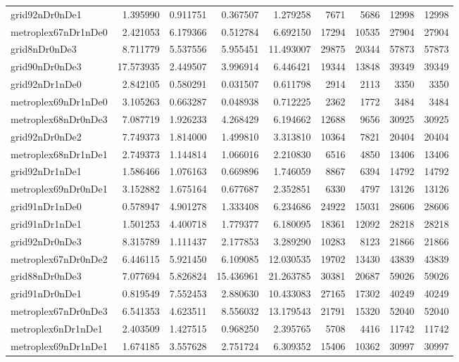 \begin{longtable}{|l|r|r|r|r|r|r|r|r|}
grid92nDr0nDe1 & 1.395990 & 0.911751 & 0.367507 & 1.279258 & 7671 & 5686 & 12998 & 12998 \\
metroplex67nDr1nDe0 & 2.421053 & 6.179366 & 0.512784 & 6.692150 & 17294 & 10535 & 27904 & 27904 \\
grid8nDr0nDe3 & 8.711779 & 5.537556 & 5.955451 & 11.493007 & 29875 & 20344 & 57873 & 57873 \\
grid90nDr0nDe3 & 17.573935 & 2.449507 & 3.996914 & 6.446421 & 19344 & 13848 & 39349 & 39349 \\
grid92nDr1nDe0 & 2.842105 & 0.580291 & 0.031507 & 0.611798 & 2914 & 2113 & 3350 & 3350 \\
metroplex69nDr1nDe0 & 3.105263 & 0.663287 & 0.048938 & 0.712225 & 2362 & 1772 & 3484 & 3484 \\
metroplex68nDr0nDe3 & 7.087719 & 1.926233 & 4.268429 & 6.194662 & 12688 & 9656 & 30925 & 30925 \\
grid92nDr0nDe2 & 7.749373 & 1.814000 & 1.499810 & 3.313810 & 10364 & 7821 & 20404 & 20404 \\
metroplex68nDr1nDe1 & 2.749373 & 1.144814 & 1.066016 & 2.210830 & 6516 & 4850 & 13406 & 13406 \\
grid92nDr1nDe1 & 1.586466 & 1.076163 & 0.669896 & 1.746059 & 8867 & 6394 & 14792 & 14792 \\
metroplex69nDr0nDe1 & 3.152882 & 1.675164 & 0.677687 & 2.352851 & 6330 & 4797 & 13126 & 13126 \\
grid91nDr1nDe0 & 0.578947 & 4.901278 & 1.333408 & 6.234686 & 24922 & 15031 & 28606 & 28606 \\
grid91nDr1nDe1 & 1.501253 & 4.400718 & 1.779377 & 6.180095 & 18361 & 12092 & 28218 & 28218 \\
grid92nDr0nDe3 & 8.315789 & 1.111437 & 2.177853 & 3.289290 & 10283 & 8123 & 21866 & 21866 \\
metroplex67nDr0nDe2 & 6.446115 & 5.921450 & 6.109085 & 12.030535 & 19702 & 13430 & 43839 & 43839 \\
grid88nDr0nDe3 & 7.077694 & 5.826824 & 15.436961 & 21.263785 & 30381 & 20687 & 59026 & 59026 \\
grid91nDr0nDe1 & 0.819549 & 7.552453 & 2.880630 & 10.433083 & 27165 & 17302 & 40249 & 40249 \\
metroplex67nDr0nDe3 & 6.541353 & 4.623511 & 8.556032 & 13.179543 & 21791 & 15320 & 52040 & 52040 \\
metroplex6nDr1nDe1 & 2.403509 & 1.427515 & 0.968250 & 2.395765 & 5708 & 4416 & 11742 & 11742 \\
metroplex69nDr1nDe1 & 1.674185 & 3.557628 & 2.751724 & 6.309352 & 15406 & 10362 & 30997 & 30997 \\

\end{longtable}
